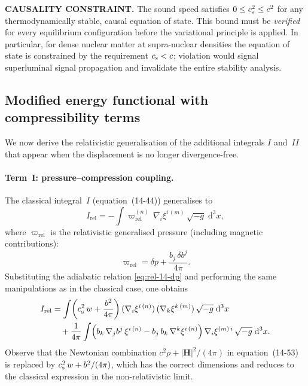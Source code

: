 \medskip
\noindent\textbf{CAUSALITY CONSTRAINT.}
The sound speed satisfies $0 \le c_{\mathrm{s}}^{2} \le c^{2}$ for any
thermodynamically stable, causal equation of state.  This bound must
be \emph{verified} for every equilibrium configuration before the
variational principle is applied.  In particular, for dense nuclear
matter at supra-nuclear densities the equation of state is
constrained by the requirement $c_{\mathrm{s}} < c$; violation would signal
superluminal signal propagation and invalidate the entire stability
analysis.

\subsection{Modified energy functional with compressibility
  terms}\label{sec:rel-123b}

We now derive the relativistic generalisation of the additional
integrals $I$ and~$\mathit{II}$ that appear when the displacement is
no longer divergence-free.

\paragraph{Term~$\boldsymbol{I}$: pressure--compression coupling.}
The classical integral~$I$ (equation~(14-44)) generalises to
\begin{equation}\label{eq:rel-14-I}
  I_{\mathrm{rel}}
  = -\int \varpi_{\mathrm{rel}}^{(n)}\,
      \nabla_{i}\xi^{i\,(m)}\,\sqrt{-g}\;\mathrm{d}^{3}x,
\end{equation}
where $\varpi_{\mathrm{rel}}$ is the relativistic generalised
pressure (including magnetic contributions):
\begin{equation}\label{eq:rel-14-varpi}
  \varpi_{\mathrm{rel}}
  = \delta p + \frac{b_{j}\,\delta b^{j}}{4\pi}.
\end{equation}
Substituting the adiabatic relation \eqref{eq:rel-14-dp} and
performing the same manipulations as in the classical case, one
obtains
\begin{align}\label{eq:rel-14-I-expand}
  I_{\mathrm{rel}}
  &= \int \!\left(c_{\mathrm{s}}^{2}\,w
     + \frac{b^{2}}{4\pi}\right)
     (\nabla_{i}\xi^{i\,(n)})\,
     (\nabla_{k}\xi^{k\,(m)})\,
     \sqrt{-g}\;\mathrm{d}^{3}x
  \notag\\
  &\quad
     + \frac{1}{4\pi}\int\!
       \left(b_{k}\,\nabla_{j}b^{j}\,
       \xi^{i\,(n)}
       - b_{j}\,b_{k}\,\nabla^{k}\xi^{i\,(n)}\right)
       \nabla_{i}\xi^{(m)\,i}\,
       \sqrt{-g}\;\mathrm{d}^{3}x.
\end{align}
Observe that the Newtonian combination $c^{2}\rho +
|\mathbf{H}|^{2}/(4\pi)$ in equation~(14-53) is replaced by
$c_{\mathrm{s}}^{2}\,w + b^{2}/(4\pi)$, which has the correct dimensions and
reduces to the classical expression in the non-relativistic limit.

